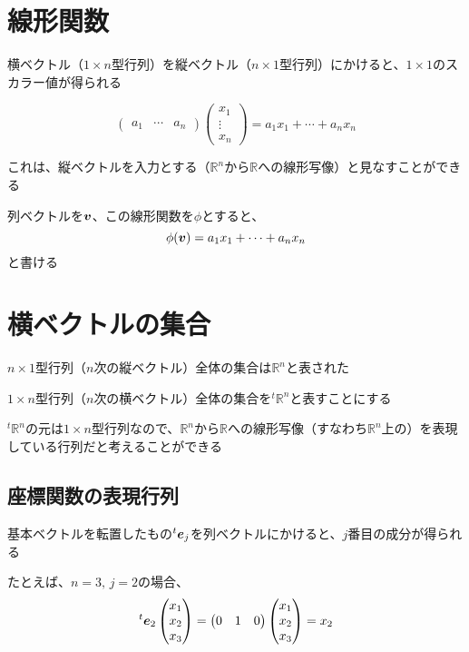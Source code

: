 \documentclass[../../../topic_linear-algebra]{subfiles}
\begin{document}
\sectionline
\section{線形関数}

横ベクトル（$1 \times n$型行列）を縦ベクトル（$n \times 1$型行列）にかけると、$1 \times 1$のスカラー値が得られる

\begin{equation*}
  \begin{pmatrix}
    a_1 & \cdots & a_n
  \end{pmatrix} \begin{pmatrix}
    x_1    \\
    \vdots \\
    x_n
  \end{pmatrix}
  = a_1 x_1 + \cdots + a_n x_n
\end{equation*}

\br

これは、縦ベクトルを入力とする（$\mathbb{R}^n$から$\mathbb{R}$への線形写像）と見なすことができる

列ベクトルを$\vb*{v}$、この線形関数を$\phi$とすると、
\begin{equation*}
  \phi(\vb*{v}) = a_1 x_1 + \cdots + a_n x_n
\end{equation*}
と書ける

\sectionline
\section{横ベクトルの集合}

$n \times 1$型行列（$n$次の縦ベクトル）全体の集合は$\mathbb{R}^n$と表された

$1 \times n$型行列（$n$次の横ベクトル）全体の集合を${}^t\mathbb{R}^n$と表すことにする

\br

${}^t\mathbb{R}^n$の元は$1 \times n$型行列なので、$\mathbb{R}^n$から$\mathbb{R}$への線形写像（すなわち$\mathbb{R}^n$上の）を表現している行列だと考えることができる

\subsection{座標関数の表現行列}

基本ベクトルを転置したもの${}^t\vb*{e}_j$を列ベクトルにかけると、$j$番目の成分が得られる

たとえば、$n=3,\,j=2$の場合、
\begin{equation*}
  {}^t\vb*{e}_2\begin{pmatrix}
    x_1 \\
    x_2 \\
    x_3
  \end{pmatrix} = \begin{pmatrix}
    0 & 1 & 0
  \end{pmatrix}
  \begin{pmatrix}
    x_1 \\
    x_2 \\
    x_3
  \end{pmatrix}
  = x_2
\end{equation*}
\end{document}
